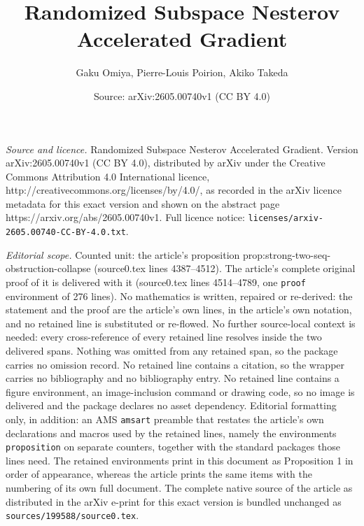 \documentclass[10pt,a4paper]{amsart}
\title{Randomized Subspace Nesterov Accelerated Gradient}
\author{Gaku Omiya, Pierre-Louis Poirion, Akiko Takeda}
\date{Source: arXiv:2605.00740v1 (CC BY 4.0)}
\begin{document}
\maketitle

\noindent\emph{Source and licence.} Randomized Subspace Nesterov Accelerated Gradient. Version arXiv:2605.00740v1 (CC BY 4.0), distributed by arXiv under the Creative Commons Attribution 4.0 International licence, http://creativecommons.org/licenses/by/4.0/, as recorded in the arXiv licence metadata for this exact version and shown on the abstract page https://arxiv.org/abs/2605.00740v1. Full licence notice: \texttt{licenses/arxiv-2605.00740-CC-BY-4.0.txt}.\par\smallskip

\noindent\textit{Editorial scope.} Counted unit: the article's proposition prop:strong-two-seq-obstruction-collapse (source0.tex lines 4387--4512). The article's complete original proof of it is delivered with it (source0.tex lines 4514--4789, one \texttt{proof} environment of 276 lines). No mathematics is written, repaired or re-derived: the statement and the proof are the article's own lines, in the article's own notation, and no retained line is substituted or re-flowed.  No further source-local context is needed: every cross-reference of every retained line resolves inside the two delivered spans.  Nothing was omitted from any retained span, so the package carries no omission record.  No retained line contains a citation, so the wrapper carries no bibliography and no bibliography entry.  No retained line contains a figure environment, an image-inclusion command or drawing code, so no image is delivered and the package declares no asset dependency.  Editorial formatting only, in addition: an AMS \texttt{amsart} preamble that restates the article's own declarations and macros used by the retained lines, namely the environments \texttt{proposition} on separate counters, together with the standard packages those lines need.  The retained environments print in this document as Proposition 1 in order of appearance, whereas the article prints the same items with the numbering of its own full document.  The complete native source of the article as distributed in the arXiv e-print for this exact version is bundled unchanged as \texttt{sources/199588/source0.tex}.
\end{document}

